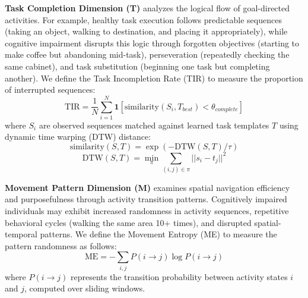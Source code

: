 \documentclass[sigconf, anonymous, 9pt, nonacm]{acmart}
\begin{document}
\noindent\textbf{Task Completion Dimension (T)} analyzes the logical flow of goal-directed activities. 
For example, healthy task execution follows predictable sequences (taking an object, walking to destination, and placing it appropriately), while cognitive impairment disrupts this logic through forgotten objectives (starting to make coffee but abandoning mid-task), perseveration (repeatedly checking the same cabinet), and task substitution (beginning one task but completing another). 
We define the Task Incompletion Rate (TIR) to measure the proportion of interrupted sequences:
\begin{equation*}
\text{TIR} = \frac{1}{N}\sum_{i=1}^{N} \mathbf{1}[\text{similarity}(S_i, T_{best}) < \theta_{complete}]
\end{equation*}
where $S_i$ are observed sequences matched against learned task templates $T$ using dynamic time warping (DTW) distance:
\begin{equation*}
\text{similarity}(S, T) = \exp(-\text{DTW}(S, T) / \tau)
\end{equation*}
\begin{equation*}
\text{DTW}(S, T) = \min_{\pi} \sum_{(i,j) \in \pi} ||s_i - t_j||^2
\end{equation*}

\noindent\textbf{Movement Pattern Dimension (M)} examines spatial navigation efficiency and purposefulness through activity transition patterns. Cognitively impaired individuals may exhibit increased randomness in activity sequences, repetitive behavioral cycles (walking the same area 10+ times), and disrupted spatial-temporal patterns.
We define the Movement Entropy (ME) to measure the pattern randomness as follows:
\begin{equation*}
\text{ME} = -\sum_{i,j} P(i \rightarrow j) \log P(i \rightarrow j)
\end{equation*}
where $P(i \rightarrow j)$ represents the transition probability between activity states $i$ and $j$, computed over sliding windows.
\end{document}
